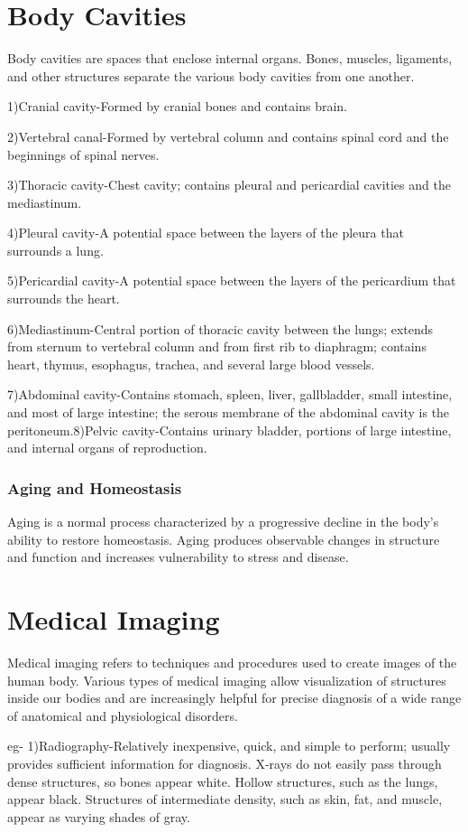 \documentclass[11pt]{article}
\begin{document}
\section{Body Cavities}
Body cavities are spaces that enclose internal organs. Bones, muscles,
ligaments, and other structures separate the various body cavities from
one another.\item 1)Cranial cavity-Formed by cranial bones and contains brain.\item 2)Vertebral canal-Formed by vertebral column and contains spinal
cord and the beginnings of spinal nerves.\item 3)Thoracic cavity-Chest cavity; contains pleural and pericardial
cavities and the mediastinum.\item 4)Pleural cavity-A potential space between the layers of the
pleura that surrounds a lung.\item 5)Pericardial cavity-A potential space between the layers of the
pericardium that surrounds the heart.\item 6)Mediastinum-Central portion of thoracic cavity between the
lungs; extends from sternum to vertebral column
and from first rib to diaphragm; contains heart,
thymus, esophagus, trachea, and several large
blood vessels.\item 7)Abdominal cavity-Contains stomach, spleen, liver, gallbladder,
small intestine, and most of large intestine; the
serous membrane of the abdominal cavity is
the peritoneum.8)Pelvic cavity-Contains urinary bladder, portions of large
intestine, and internal organs of reproduction.
\subsubsection{Aging and Homeostasis}
Aging is a normal process characterized by a
progressive decline in the body’s ability to restore homeostasis.
Aging produces observable changes in structure and function and
increases vulnerability to stress and disease.
\section{Medical Imaging}
Medical imaging refers to techniques and procedures used to create
images of the human body. Various types of medical imaging allow
visualization of structures inside our bodies and are increasingly
helpful for precise diagnosis of a wide range of anatomical and physiological  disorders.
\item eg- 1)Radiography-Relatively inexpensive, quick, and simple to perform; usually
provides sufficient information for diagnosis. X-rays do not easily pass
through dense structures, so bones appear white. Hollow structures,
such as the lungs, appear black. Structures of intermediate density, such
as skin, fat, and muscle, appear as varying shades of gray.
\end{document}
